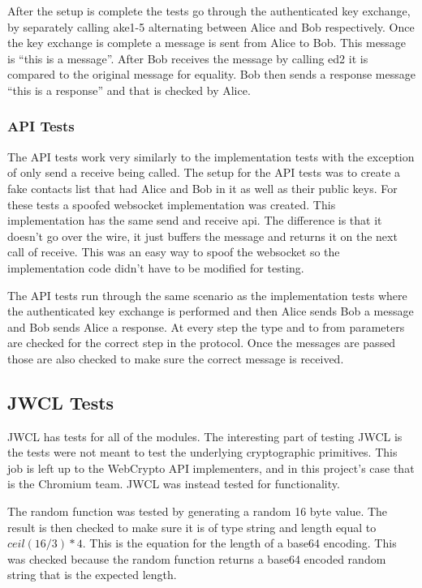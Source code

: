 After the setup is complete the tests go through the authenticated key exchange, by separately calling ake1-5 alternating between Alice and Bob respectively. Once the key exchange is complete a message is sent from Alice to Bob. This message is “this is a message”. After Bob receives the message by calling ed2 it is compared to the original message for equality. Bob then sends a response message “this is a response” and that is checked by Alice.


\subsubsection{API Tests} 


The API tests work very similarly to the implementation tests with the exception of only send a receive being called. The setup for the API tests was to create a fake contacts list that had Alice and Bob in it as well as their public keys. For these tests a spoofed websocket implementation was created. This implementation has the same send and receive api. The difference is that it doesn’t go over the wire, it just buffers the message and returns it on the next call of receive. This was an easy way to spoof the websocket so the implementation code didn’t have to be modified for testing.


The API tests run through the same scenario as the implementation tests where the authenticated key exchange is performed and then Alice sends Bob a message and Bob sends Alice a response. At every step the type and to from parameters are checked for the correct step in the protocol. Once the messages are passed those are also checked to make sure the correct message is received.


\subsection{JWCL Tests}


JWCL has tests for all of the modules. The interesting part of testing JWCL is the tests were not meant to test the underlying cryptographic primitives. This job is left up to the WebCrypto API implementers, and in this project's case that is the Chromium team. JWCL was instead tested for functionality.


The random function was tested by generating a random 16 byte value. The result is then checked to make sure it is of type string and length equal to $ceil(16/3)*4$. This is the equation for the length of a base64 encoding. This was checked because the random function returns a base64 encoded random string that is the expected length.


